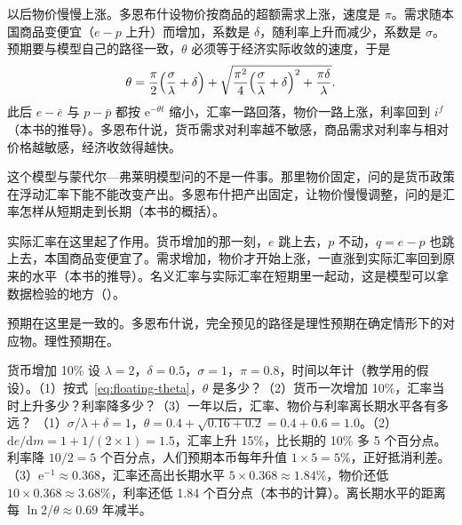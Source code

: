 以后物价慢慢上涨。多恩布什设物价按商品的超额需求上涨，速度是 $\pi$\cite{dornbusch1976}。需求随本国商品变便宜（$e-p$ 上升）而增加，系数是 $\delta$，随利率上升而减少，系数是 $\sigma$\cite{dornbusch1976}。预期要与模型自己的路径一致，$\theta$ 必须等于经济实际收敛的速度，于是\cite{dornbusch1976}
\begin{equation}
\theta=\frac{\pi}{2}\Bigl(\frac{\sigma}{\lambda}+\delta\Bigr)+\sqrt{\frac{\pi^{2}}{4}\Bigl(\frac{\sigma}{\lambda}+\delta\Bigr)^{2}+\frac{\pi\delta}{\lambda}} .\label{eq:floating-theta}
\end{equation}
此后 $e-\bar e$ 与 $p-\bar p$ 都按 $\mathrm{e}^{-\theta t}$ 缩小，汇率一路回落，物价一路上涨，利率回到 $i^{f}$（本书的推导）。多恩布什说，货币需求对利率越不敏感，商品需求对利率与相对价格越敏感，经济收敛得越快\cite{dornbusch1976}。

这个模型与蒙代尔—弗莱明模型问的不是一件事。那里物价固定，问的是货币政策在浮动汇率下能不能改变产出。多恩布什把产出固定，让物价慢慢调整，问的是汇率怎样从短期走到长期（本书的概括）。

实际汇率在这里起了作用。货币增加的那一刻，$e$ 跳上去，$p$ 不动，$q=e-p$ 也跳上去，本国商品变便宜了。需求增加，物价才开始上涨，一直涨到实际汇率回到原来的水平（本书的推导）。名义汇率与实际汇率在短期里一起动，这是模型可以拿数据检验的地方（）。

预期在这里是一致的。多恩布什说，完全预见的路径是理性预期在确定情形下的对应物\cite{dornbusch1976}。理性预期在。

\begin{example}{货币增加 10\%}\label{ex:floating-overshoot}
设 $\lambda=2$，$\delta=0.5$，$\sigma=1$，$\pi=0.8$，时间以年计（教学用的假设）。（1）按式~\eqref{eq:floating-theta}，$\theta$ 是多少？（2）货币一次增加 10\%，汇率当时上升多少？利率降多少？（3）一年以后，汇率、物价与利率离长期水平各有多远？
\solution
（1）$\sigma/\lambda+\delta=1$，$\theta=0.4+\sqrt{0.16+0.2}=0.4+0.6=1.0$。（2）$\mathrm{d}e/\mathrm{d}m=1+1/(2\times1)=1.5$，汇率上升 15\%，比长期的 10\% 多 5 个百分点。利率降 $10/2=5$ 个百分点，人们预期本币每年升值 $1\times5=5\%$，正好抵消利差。（3）$\mathrm{e}^{-1}\approx0.368$，汇率还高出长期水平 $5\times0.368\approx1.84\%$，物价还低 $10\times0.368\approx3.68\%$，利率还低 1.84 个百分点（本书的计算）。离长期水平的距离每 $\ln2/\theta\approx0.69$ 年减半。
\end{example}


